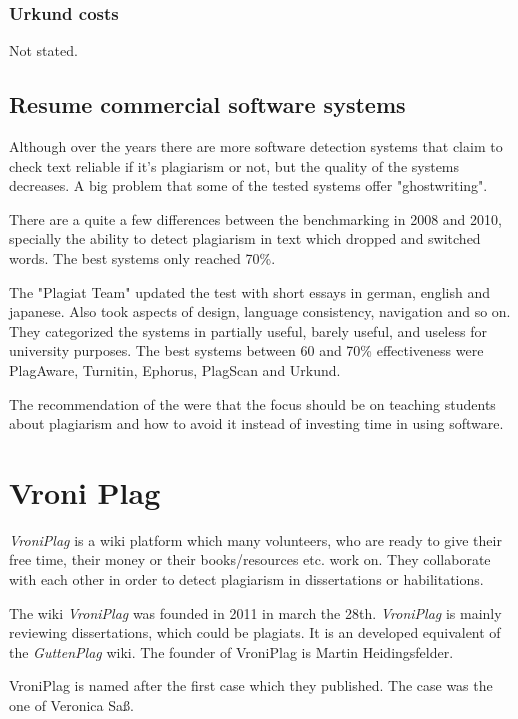 \subsubsection{Urkund costs}
Not stated.


\newpage

\subsection{Resume commercial software systems}

Although over the years there are more software detection systems that claim to check text reliable if it's plagiarism or not, but the quality of the systems decreases. 
A big problem that some of the tested systems offer "ghostwriting".

There are a quite a few differences between the benchmarking in 2008 and 2010, specially the ability to detect plagiarism in text which dropped and switched words. The best systems only reached 70\%.

The "Plagiat Team" updated the test with short essays in german, english and japanese.
Also took aspects of design, language consistency, navigation and so on.
They  categorized the systems in partially useful, barely useful, and useless for university purposes. The best systems between 60 and 70\% effectiveness were PlagAware, Turnitin, Ephorus, PlagScan and Urkund. \citep{PlagiatTeam} 

The recommendation of  the \citet{PlagiatTeam} were that the focus should be on teaching students about plagiarism and how to avoid it instead of investing time in using software. 


\section{Vroni Plag}
\textit{VroniPlag}  is a wiki platform which many volunteers, who are ready to give their free time, their money or 
their books/resources etc. work on. They collaborate with each other in order to detect plagiarism in dissertations or
habilitations.

The wiki \textit{VroniPlag} was founded in 2011 in march the 28th. \textit{VroniPlag}  is mainly reviewing dissertations, which could be plagiats. It is an developed equivalent of the \textit{GuttenPlag} wiki. The founder of VroniPlag is Martin Heidingsfelder.
\citep{Wikipedia}


VroniPlag is named after the first case which they published. The case was the one of Veronica Saß.

